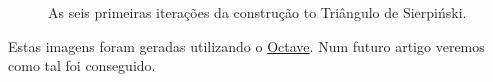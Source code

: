 \documentclass[11pt]{article}
\begin{document}
\begin{figure}[H]
  \centering



  \caption{As seis primeiras iterações da construção to Triângulo de
    Sierpiński.}
\end{figure}

Estas imagens foram geradas utilizando o
\href{http://www.gnu.org/software/octave/}{Octave}. Num futuro artigo
veremos como tal foi conseguido.
  
\end{document}
